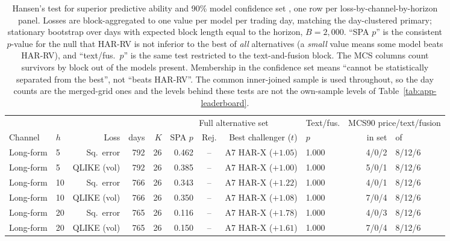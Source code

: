 \begin{table}[htbp]
\centering
\caption[Superior-predictive-ability tests, all 18 panels]{Hansen's test
for superior predictive ability \cite{hansen2005spa} and 90\% model
confidence set \cite{hansen2011mcs}, one row per loss-by-channel-by-horizon
panel. Losses are block-aggregated to one value per model per trading day,
matching the day-clustered primary; stationary bootstrap
\cite{politis1994stationary} over days with expected block length equal to
the horizon, $B = 2{,}000$. ``SPA $p$'' is the consistent $p$-value for the
null that HAR-RV is not inferior to the best of \emph{all} alternatives
(a \emph{small} value means some model beats HAR-RV), and ``text/fus.\
$p$'' is the same test restricted to the text-and-fusion block. The MCS
columns count survivors by block out of the models present. Membership in
the confidence set means ``cannot be statistically separated from the
best'', not ``beats HAR-RV''. The common inner-joined sample is used
throughout, so the day counts are the merged-grid ones and the levels
behind these tests are not the own-sample levels of
Table~\ref{tab:app-leaderboard}.}
\label{tab:app-spa}
\singlespacing\footnotesize
\setlength{\tabcolsep}{2.5pt}
\begin{tabular}{@{}llrrrrcrlrl@{}}
\toprule
& & & & & \multicolumn{3}{c}{Full alternative set} & Text/fus. & \multicolumn{2}{c}{MCS90 price/text/fusion} \\
\cmidrule(lr){6-8}\cmidrule(lr){9-9}\cmidrule(lr){10-11}
Channel & $h$ & Loss & days & $K$ & SPA $p$ & Rej. & Best challenger ($t$) & $p$ & in set & of \\
\midrule
Long-form & 5 & Sq.\ error & 792 & 26 & 0.462 & -- & A7 HAR-X ($+1.05$) & 1.000 & 4/0/2 & 8/12/6 \\
Long-form & 5 & QLIKE (vol) & 792 & 26 & 0.385 & -- & A7 HAR-X ($+1.00$) & 1.000 & 5/0/1 & 8/12/6 \\
Long-form & 10 & Sq.\ error & 766 & 26 & 0.343 & -- & A7 HAR-X ($+1.22$) & 1.000 & 4/0/1 & 8/12/6 \\
Long-form & 10 & QLIKE (vol) & 766 & 26 & 0.350 & -- & A7 HAR-X ($+1.08$) & 1.000 & 7/0/4 & 8/12/6 \\
Long-form & 20 & Sq.\ error & 765 & 26 & 0.116 & -- & A7 HAR-X ($+1.78$) & 1.000 & 4/0/3 & 8/12/6 \\
Long-form & 20 & QLIKE (vol) & 765 & 26 & 0.150 & -- & A7 HAR-X ($+1.61$) & 1.000 & 7/0/4 & 8/12/6 \\

\end{tabular}
\end{table}
